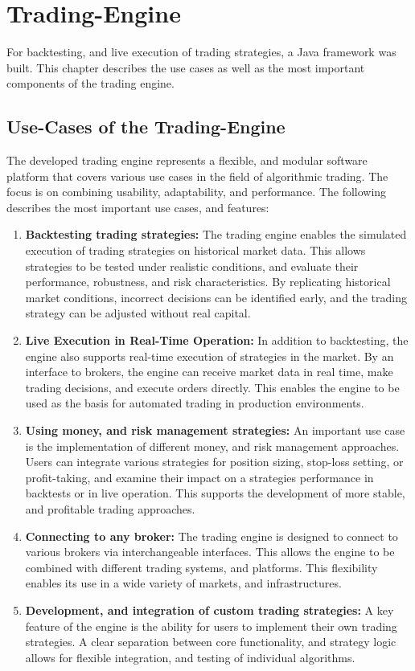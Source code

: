 \section{Trading-Engine}

For backtesting, and live execution of trading strategies, a Java framework was built.
This chapter describes the use cases as well as the most important components of the trading engine.

\subsection{Use-Cases of the Trading-Engine}
\label{chap:te-use-cases}

The developed trading engine represents a flexible, and modular software platform that covers various use cases in the field of algorithmic trading.
The focus is on combining usability, adaptability, and performance.
The following describes the most important use cases, and features:

\begin{enumerate}
    \item \textbf{Backtesting trading strategies:} The trading engine enables the simulated execution of trading strategies on historical market data.
    This allows strategies to be tested under realistic conditions, and evaluate their performance, robustness, and risk characteristics.
    By replicating historical market conditions, incorrect decisions can be identified early, and the trading strategy can be adjusted without real capital.
    \item \textbf{Live Execution in Real-Time Operation:} In addition to backtesting, the engine also supports real-time execution of strategies in the market.
    By an interface to brokers, the engine can receive market data in real time, make trading decisions, and execute orders directly.
    This enables the engine to be used as the basis for automated trading in production environments.
    \item \textbf{Using money, and risk management strategies:} An important use case is the implementation of different money, and risk management approaches.
    Users can integrate various strategies for position sizing, stop-loss setting, or profit-taking, and examine their impact on a strategies performance in backtests or in live operation.
    This supports the development of more stable, and profitable trading approaches.
    \item \textbf{Connecting to any broker:} The trading engine is designed to connect to various brokers via interchangeable interfaces.
    This allows the engine to be combined with different trading systems, and platforms.
    This flexibility enables its use in a wide variety of markets, and infrastructures.
    \item \textbf{Development, and integration of custom trading strategies:} A key feature of the engine is the ability for users to implement their own trading strategies.
    A clear separation between core functionality, and strategy logic allows for flexible integration, and testing of individual algorithms.
\end{enumerate}

